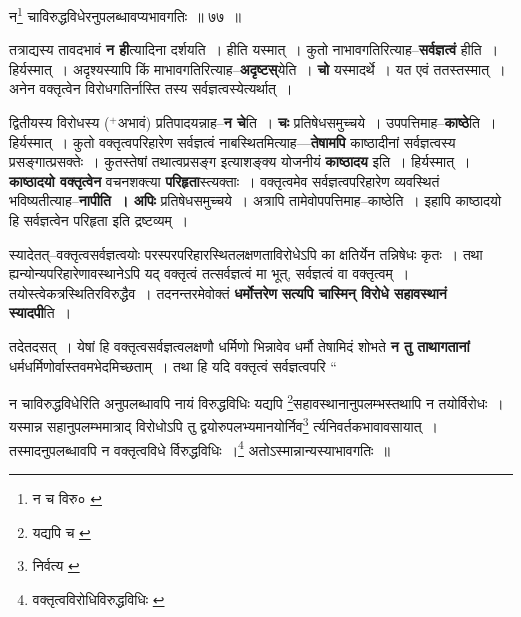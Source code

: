 \documentclass[article,12pt,a4paper]{memoir}
\newcommand{\add}[1]{($^{+}$#1)}
\begin{document}
	  \endgroup
	
	  \bigskip
	  \begingroup
	

	  \pstart न\footnote{न च विरु० \cite{dp-msC}} चाविरुद्धविधेरनुपलब्धावप्यभावगतिः ॥ ७७ ॥
	\pend
      
	  \endgroup
	

	  \pstart तत्राद्यस्य तावदभावं \textbf{न ही}त्यादिना दर्शयति । हीति यस्मात् । कुतो नाभावगतिरित्याह--\textbf{सर्वज्ञत्वं} हीति । हिर्यस्मात् । अदृश्यस्यापि किं माभावगतिरित्याह--\textbf{अदृष्टस्}येति । \textbf{चो} यस्मादर्थे । यत एवं ततस्तस्मात् । अनेन वक्तृत्वेन विरोधगतिर्नास्ति तस्य सर्वज्ञत्वस्येत्यर्थात् ।
	\pend
      

	  \pstart द्वितीयस्य विरोधस्य \add{अभावं} प्रतिपादयन्नाह--\textbf{न चे}ति । \textbf{चः} प्रतिषेधसमुच्चये । उपपत्तिमाह--\textbf{काष्ठे}ति । हिर्यस्मात् । कुतो वक्तृत्वपरिहारेण सर्वज्ञत्वं नाबस्थितमित्याह—\textbf{तेषामपि} काष्ठादीनां सर्वज्ञत्वस्य प्रसङ्गात्प्रसक्तेः । कुतस्तेषां तथात्वप्रसङ्ग इत्याशङ्क्य योजनीयं \textbf{काष्ठादय} इति । हिर्यस्मात् । \textbf{काष्ठादयो वक्तृत्वेन} वचनशक्त्या \textbf{परिहृता}स्त्यक्ताः । वक्तृत्वमेव सर्वज्ञत्वपरिहारेण व्यवस्थितं भविष्यतीत्याह--\textbf{नापीति । अपिः} प्रतिषेधसमुच्चये । अत्रापि तामेवोपपत्तिमाह--काष्ठेति । इहापि काष्ठादयो हि सर्वज्ञत्वेन परिहृता इति द्रष्टव्यम् ।
	\pend
      

	  \pstart स्यादेतत्--वक्तृत्वसर्वज्ञत्वयोः परस्परपरिहारस्थितलक्षणताविरोधेऽपि का क्षतिर्येन तन्निषेधः कृतः । तथा ह्यन्योन्यपरिहारेणावस्थानेऽपि यद् वक्तृत्वं तत्सर्वज्ञत्वं मा भूत्, सर्वज्ञत्वं वा वक्तृत्वम् । तयोस्त्वेकत्रस्थितिरविरुद्धैव । तदनन्तरमेवोक्तं \textbf{धर्मोत्तरेण} \leavevmode{} \textbf{सत्यपि चास्मिन् विरोधे सहावस्थानं स्यादपी}ति ।
	\pend
      

	  \pstart तदेतदसत् । येषां हि वक्तृत्वसर्वज्ञत्वलक्षणौ धर्मिणो भिन्नावेव धर्मौ तेषामिदं शोभते \textbf{न तु ताथागतानां} धर्मधर्मिणोर्वास्तवमभेदमिच्छताम् । तथा हि यदि वक्तृत्वं सर्वज्ञत्वपरि  \leavevmode{} “
	  
	न चाविरुद्धविधेरिति अनुपलब्धावपि नायं विरुद्धविधिः यद्यपि \footnote{यद्यपि च \cite{dp-msA} \cite{dp-msB} \cite{dp-edP} \cite{dp-edH} \cite{dp-edE} \cite{dp-edN}}सहावस्थानानुपलम्भस्तथापि न तयोर्विरोधः । यस्मान्न सहानुपलम्भमात्राद् विरोधोऽपि तु द्वयोरुपलभ्यमानयोर्निव\footnote{निर्वत्य \cite{dp-msA}} र्त्यनिवर्तकभावावसायात् । तस्मादनुपलब्धावपि न वक्तृत्वविधे र्विरुद्धविधिः ।\footnote{वक्तृत्वविरोधिविरुद्धविधिः \cite{dp-msA} \cite{dp-msB} \cite{dp-edP} \cite{dp-edH} \cite{dp-edN}} अतोऽस्मान्नान्यस्याभावगतिः ॥ 
	  
\end{document}
